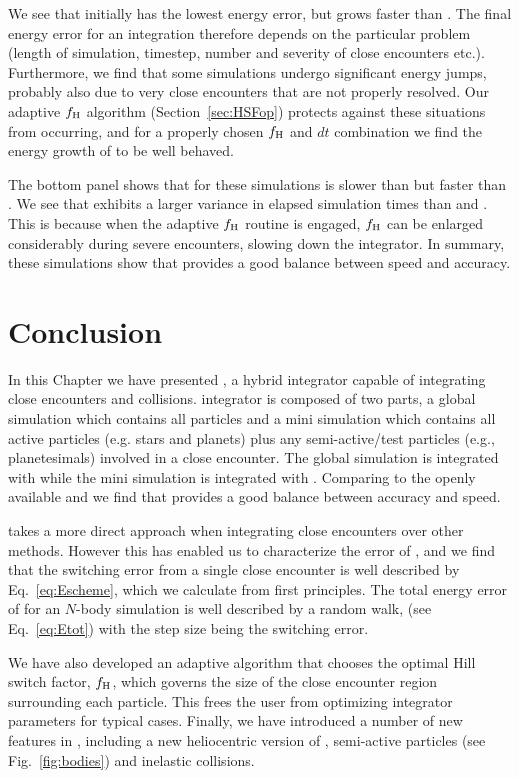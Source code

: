 We see that \hermes initially has the lowest energy error, but grows faster than \mercury.  
The final energy error for an integration therefore depends on the particular problem (length of simulation, timestep, number and severity of close encounters etc.).
Furthermore, we find that some \mercury simulations undergo significant energy jumps, probably also due to very close encounters that are not properly resolved. 
Our adaptive $f_{\rm H}$ algorithm (Section~\ref{sec:HSFop}) protects against these situations from occurring, and for a properly chosen $f_{\rm H}$ and $dt$ combination we find the energy growth of \hermes to be well behaved. 

The bottom panel shows that for these simulations \hermes is slower than \symba but faster than \mercury. 
We see that \hermes exhibits a larger variance in elapsed simulation times than \mercury and \symba. 
This is because when the adaptive $f_{\rm H}$ routine is engaged, $f_{\rm H}$ can be enlarged considerably during severe encounters, slowing down the integrator. 
In summary, these simulations show that \hermes provides a good balance between speed and accuracy.

\section{Conclusion}
\label{sec:Conclusion}
In this Chapter we have presented \hermes, a hybrid integrator capable of integrating close encounters and collisions. 
\hermes integrator is composed of two parts, a global simulation which contains all particles and a mini simulation which contains all active particles (e.g. stars and planets) plus any semi-active/test particles (e.g., planetesimals) involved in a close encounter.
The global simulation is integrated with \whfast while the mini simulation is integrated with \ias.
Comparing \hermes to the openly available \mercury and \symba we find that \hermes provides a good balance between accuracy and speed.

\hermes takes a more direct approach when integrating close encounters over other methods.
However this has enabled us to characterize the error of \hermes, and we find that the switching error from a single close encounter is well described by Eq.~\ref{eq:Escheme}, which we calculate from first principles.
The total energy error of \hermes for an $N$-body simulation is well described by a random walk, (see Eq.~\ref{eq:Etot}) with the step size being the switching error.

We have also developed an adaptive algorithm that chooses the optimal Hill switch factor, $f_{\rm H}$, which governs the size of the close encounter region surrounding each particle.
This frees the user from optimizing integrator parameters for typical cases. 
Finally, we have introduced a number of new features in \reb, including a new heliocentric version of \whfast, semi-active particles (see Fig.~\ref{fig:bodies}) and inelastic collisions.

